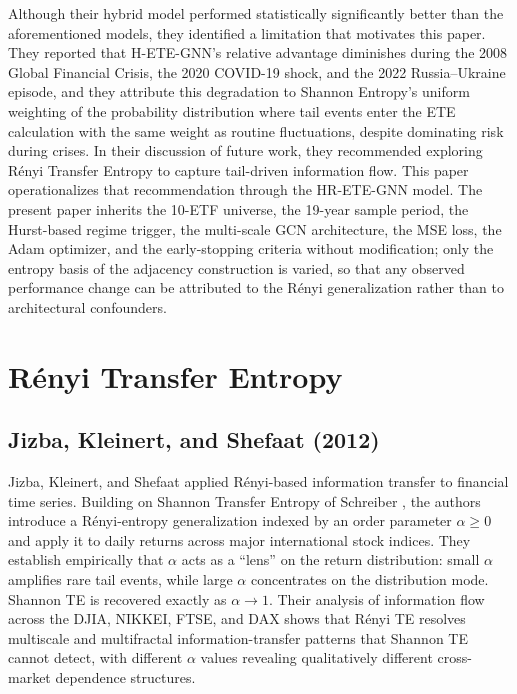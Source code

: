 \documentclass[12pt,oneside]{report}
\begin{document}
Although their hybrid model performed statistically significantly better
than the aforementioned models, they identified a limitation that
motivates this paper. They reported that H-ETE-GNN's relative advantage
diminishes during the 2008 Global Financial Crisis, the 2020 COVID-19
shock, and the 2022 Russia--Ukraine episode, and they attribute this
degradation to Shannon Entropy's uniform weighting of the probability
distribution where tail events enter the ETE calculation with the same
weight as routine fluctuations, despite dominating risk during crises.
In their discussion of future work, they recommended exploring Rényi
Transfer Entropy to capture tail-driven information flow. This paper
operationalizes that recommendation through the HR-ETE-GNN model. The
present paper inherits the 10-ETF universe, the 19-year sample period,
the Hurst-based regime trigger, the multi-scale GCN architecture, the
MSE loss, the Adam optimizer, and the early-stopping criteria without
modification; only the entropy basis of the adjacency construction is
varied, so that any observed performance change can be attributed to the
Rényi generalization rather than to architectural confounders.

\section{Rényi Transfer Entropy}

\subsection{Jizba, Kleinert, and Shefaat (2012)}

Jizba, Kleinert, and Shefaat \cite{jizba2012} applied Rényi-based
information transfer to financial time series. Building on Shannon
Transfer Entropy of Schreiber \cite{schreiber2000}, the authors
introduce a Rényi-entropy generalization indexed by an order parameter
$\alpha \geq 0$ and apply it to daily returns across major international
stock indices. They establish empirically that $\alpha$ acts as a
``lens'' on the return distribution: small $\alpha$ amplifies rare tail
events, while large $\alpha$ concentrates on the distribution mode.
Shannon TE is recovered exactly as $\alpha \to 1$. Their analysis of
information flow across the DJIA, NIKKEI, FTSE, and DAX shows that Rényi
TE resolves multiscale and multifractal information-transfer patterns
that Shannon TE cannot detect, with different $\alpha$ values revealing
qualitatively different cross-market dependence structures.
\end{document}
